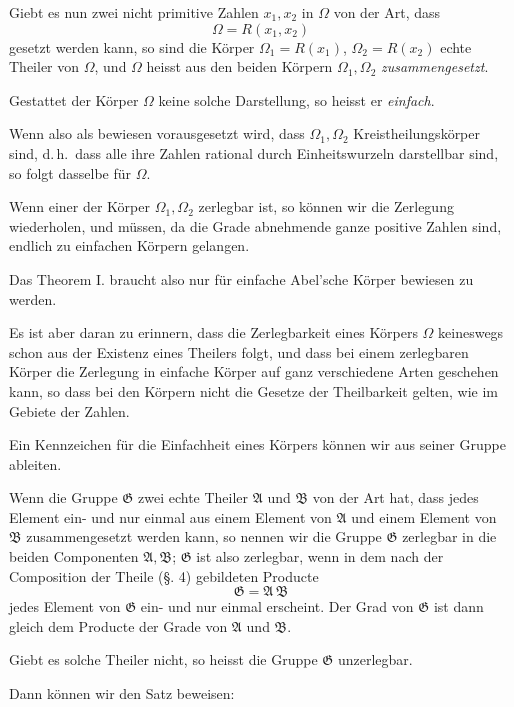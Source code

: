 \documentclass[12pt,a4paper]{article}
\begin{document}
Giebt es nun zwei nicht primitive Zahlen $x_1, x_2$ in $\Omega$ von der Art, dass
\[
\Omega = R(x_1, x_2)
\]
gesetzt werden kann, so sind die Körper $\Omega_1 = R(x_1)$, $\Omega_2 = R(x_2)$ echte Theiler von $\Omega$, und $\Omega$ heisst aus den beiden Körpern $\Omega_1, \Omega_2$ \emph{zusammengesetzt}.

Gestattet der Körper $\Omega$ keine solche Darstellung, so heisst er \emph{einfach}.

Wenn also als bewiesen vorausgesetzt wird, dass $\Omega_1, \Omega_2$ Kreistheilungskörper sind, d.\,h.\ dass alle ihre Zahlen rational durch Einheitswurzeln darstellbar sind, so folgt dasselbe für $\Omega$.

Wenn einer der Körper $\Omega_1, \Omega_2$ zerlegbar ist, so können wir die Zerlegung wiederholen, und müssen, da die Grade abnehmende ganze positive Zahlen sind, endlich zu einfachen Körpern gelangen.

Das Theorem I. braucht also nur für einfache Abel'sche Körper bewiesen zu werden.

Es ist aber daran zu erinnern, dass die Zerlegbarkeit eines Körpers $\Omega$ keineswegs schon aus der Existenz eines Theilers folgt, und dass bei einem zerlegbaren Körper die Zerlegung in einfache Körper auf ganz verschiedene Arten geschehen kann, so dass bei den Körpern nicht die Gesetze der Theilbarkeit gelten, wie im Gebiete der Zahlen.

Ein Kennzeichen für die Einfachheit eines Körpers können wir aus seiner Gruppe ableiten.

Wenn die Gruppe $\mathfrak{G}$ zwei echte Theiler $\mathfrak{A}$ und $\mathfrak{B}$ von der Art hat, dass jedes Element ein- und nur einmal aus einem Element von $\mathfrak{A}$ und einem Element von $\mathfrak{B}$ zusammengesetzt werden kann, so nennen wir die Gruppe $\mathfrak{G}$ zerlegbar in die beiden Componenten $\mathfrak{A}, \mathfrak{B}$; $\mathfrak{G}$ ist also zerlegbar, wenn in dem nach der Composition der Theile (\S. 4) gebildeten Producte
\begin{equation}\label{eq:179-1}
\mathfrak{G} = \mathfrak{A}\,\mathfrak{B}
\end{equation}
jedes Element von $\mathfrak{G}$ ein- und nur einmal erscheint. Der Grad von $\mathfrak{G}$ ist dann gleich dem Producte der Grade von $\mathfrak{A}$ und $\mathfrak{B}$.

Giebt es solche Theiler nicht, so heisst die Gruppe $\mathfrak{G}$ unzerlegbar.

Dann können wir den Satz beweisen:
\end{document}
